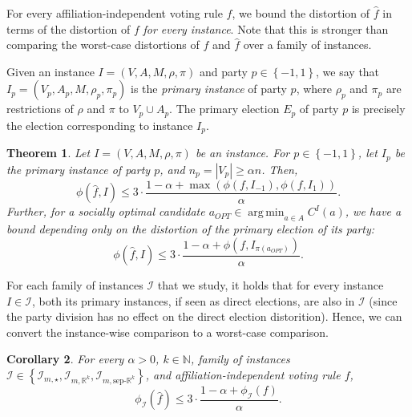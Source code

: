 \documentclass[letterpaper]{article} %
\newtheorem{theorem}{Theorem}
\newtheorem{corollary}[theorem]{Corollary}
\theoremstyle{definition}
\newcommand{\set}[1]{\left\{#1\right\}}
\renewcommand{\hat}{\widehat}
\DeclareMathOperator*{\argmin}{\arg\,\min}
\newcommand{\bbN}{\mathbb{N}}
\newcommand{\bbR}{\mathbb{R}}
\newcommand{\calI}{\mathcal{I}}
\newcommand{\pleft}{-1}
\newcommand{\pright}{1}
\newcommand{\all}{\star}
\newcommand{\sep}{\textrm{sep-}}
\newcommand{\euc}[1]{\bbR^{#1}}
\newcommand{\eucsep}[1]{\sep\euc{#1}}
\newcommand{\I}{\calI}
\begin{document}
For every affiliation-independent voting rule $f$, we bound the distortion of $\hat{f}$ in terms of the distortion of $f$ \emph{for every instance}. Note that this is stronger than comparing the worst-case distortions of $f$ and $\hat{f}$ over a family of instances.

Given an instance $I = (V,A,M,\rho,\pi)$ and party $p \in \set{\pleft,\pright}$, we say that $I_p = (V_p,A_p,M,\rho_p,\pi_p)$ is the \emph{primary instance} of party $p$, where $\rho_p$ and $\pi_p$ are restrictions of $\rho$ and $\pi$ to $V_p \cup A_p$. The primary election $E_p$ of party $p$ is precisely the election corresponding to instance $I_p$. 


\begin{theorem}
	Let $I = (V,A,M,\rho,\pi)$ be an instance. For $p \in \set{\pleft,\pright}$, let $I_p$ be the primary instance of party $p$, and $n_p = |V_p| \ge \alpha n$. Then,
	$$
	\phi(\hat{f},I) \le 3 \cdot \frac{1-\alpha+\max(\phi(f,I_{\pleft}),\phi(f,I_{\pright}))}{\alpha}.
	$$
	Further, for a socially optimal candidate $a_{OPT} \in \argmin_{a \in A} C^I(a)$, we have a bound depending only on the distortion of the primary election of its party:
	$$
	\phi(\hat{f},I) \le 3 \cdot \frac{1-\alpha+\phi(f,I_{\pi(a_{OPT})})}{\alpha}.
	$$

\label{thm:large-primaries-good}
\end{theorem}

For each family of instances $\I$ that we study, it holds that for every instance $I \in \calI$, both its primary instances, if seen as direct elections, are also in $\I$ (since the party division has no effect on the direct election distorition). Hence, we can convert the instance-wise comparison to a worst-case comparison. 

\begin{corollary}
\label{cor:large-primaries-good}
	For every $\alpha > 0$, $k \in \bbN$, family of instances $\I \in \set{\I_{m,\all},\I_{m,\euc{k}},\I_{m,\eucsep{k}}}$, and affiliation-independent voting rule $f$, 
	$$
	\phi_{\I}(\hat{f}) \le 3\cdot \frac{1-\alpha+\phi_{\I}(f)}{\alpha}.
	$$ 
\end{corollary}
\end{document}
